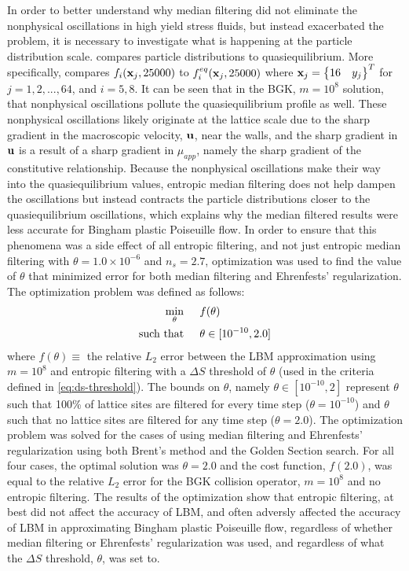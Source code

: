 In order to better understand why median filtering did not eliminate the nonphysical oscillations in high yield stress fluids, but instead exacerbated the problem, it is necessary to investigate what is happening at the particle distribution scale.
 compares particle distributions to quasiequilibrium.
More specifically,  compares $f_i(\mathbf{x}_j, 25000)$ to $f_i^{eq}(\mathbf{x}_j, 25000)$ where $\mathbf{x}_j = \begin{Bmatrix}16 & y_j\end{Bmatrix}^T$ for $j = 1, 2, ..., 64$, and $i = 5, 8$.
It can be seen that in the BGK, $m = 10^8$ solution, that nonphysical oscillations pollute the quasiequilibrium profile as well.
These nonphysical oscillations likely originate at the lattice scale due to the sharp gradient in the macroscopic velocity, $\mathbf{u}$, near the walls, and the sharp gradient in $\mathbf{u}$ is a result of a sharp gradient in $\mu_{app}$, namely the sharp gradient of the constitutive relationship.
Because the nonphysical oscillations make their way into the quasiequilibrium values, entropic median filtering does not help dampen the oscillations but instead contracts the particle distributions closer to the quasiequilibrium oscillations, which explains why the median filtered results were less accurate for Bingham plastic Poiseuille flow.
In order to ensure that this phenomena was a side effect of all entropic filtering, and not just entropic median filtering with $\theta = 1.0 \times 10^{-6}$ and $n_s = 2.7$, optimization was used to find the value of $\theta$ that minimized error for both median filtering and Ehrenfests' regularization.
The optimization problem was defined as follows:
\begin{align*}
  \min_\theta \hspace{0.2in} & f(\theta)\\
\text{such that} \hspace{0.2in} & \theta \in [10^{-10}, 2.0]
\end{align*}
\noindent where $f(\theta) \equiv $ the relative $L_2$ error between the LBM approximation using $m = 10^8$ and entropic filtering with a $\Delta S$ threshold of $\theta$ (used in the criteria defined in \eqref{eq:ds-threshold}).
The bounds on $\theta$, namely $\theta \in [10^{-10}, 2]$ represent $\theta$ such that 100\% of lattice sites are filtered for every time step ($\theta = 10^{-10}$) and $\theta$ such that no lattice sites are filtered for any time step ($\theta = 2.0$).
The optimization problem was solved for the cases of using median filtering and Ehrenfests' regularization using both Brent's method and the Golden Section search.
For all four cases, the optimal solution was $\theta = 2.0$ and the cost function, $f(2.0)$, was equal to the relative $L_2$ error for the BGK collision operator, $m = 10^8$ and no entropic filtering.
The results of the optimization show that entropic filtering, at best did not affect the accuracy of LBM, and often adversly affected the accuracy of LBM in approximating Bingham plastic Poiseuille flow, regardless of whether median filtering or Ehrenfests' regularization was used, and regardless of what the $\Delta S$ threshold, $\theta$, was set to.

